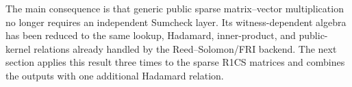 The main consequence is that generic public sparse matrix--vector multiplication no longer requires an independent Sumcheck layer.  Its witness-dependent algebra has been reduced to the same lookup, Hadamard, inner-product, and public-kernel relations already handled by the Reed--Solomon/FRI backend.  The next section applies this result three times to the sparse R1CS matrices and combines the outputs with one additional Hadamard relation.

